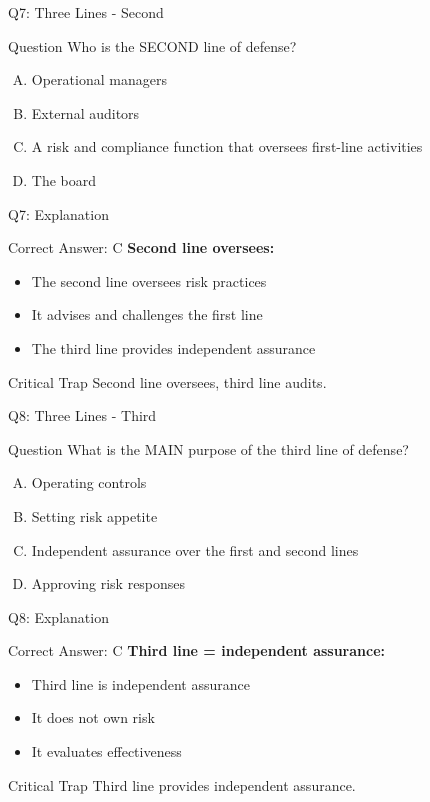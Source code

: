 \documentclass{beamer}
\begin{document}
	\begin{frame}{Q7: Three Lines - Second}
		\begin{block}{Question}
			Who is the SECOND line of defense?
		\end{block}
		\begin{enumerate}[(A)]
			\item Operational managers
			\item External auditors
			\item A risk and compliance function that oversees first-line activities
			\item The board
		\end{enumerate}
	\end{frame}
	
	\begin{frame}{Q7: Explanation}
		\begin{block}{Correct Answer: C}
			\textbf{Second line oversees:}
			\begin{itemize}
				\item The second line oversees risk practices
				\item It advises and challenges the first line
				\item The third line provides independent assurance
			\end{itemize}
		\end{block}
		\begin{alertblock}{Critical Trap}
			Second line oversees, third line audits.
		\end{alertblock}
	\end{frame}
	
	\begin{frame}{Q8: Three Lines - Third}
		\begin{block}{Question}
			What is the MAIN purpose of the third line of defense?
		\end{block}
		\begin{enumerate}[(A)]
			\item Operating controls
			\item Setting risk appetite
			\item Independent assurance over the first and second lines
			\item Approving risk responses
		\end{enumerate}
	\end{frame}
	
	\begin{frame}{Q8: Explanation}
		\begin{block}{Correct Answer: C}
			\textbf{Third line = independent assurance:}
			\begin{itemize}
				\item Third line is independent assurance
				\item It does not own risk
				\item It evaluates effectiveness
			\end{itemize}
		\end{block}
		\begin{alertblock}{Critical Trap}
			Third line provides independent assurance.
		\end{alertblock}
	\end{frame}
	
\end{document}
